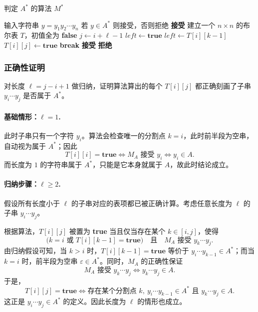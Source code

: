 \begin{answerred}
\begin{myalgo}{判定 $A^*$ 的算法 $M^*$}
\begin{algorithmic}[1]
  \Require 输入字符串 $y = y_1 y_2 \cdots y_n$
  \Ensure 若 $y \in A^*$ 则接受，否则拒绝
    \State \textbf{接受}
  \EndIf
  \State 建立一个 $n \times n$ 的布尔表 $T$，初值全为 \textbf{false}
      \State $j \gets i+\ell-1$
          \State $left \gets \mathbf{true}$
        \Else
          \State $left \gets T[i][k-1]$
        \EndIf
          \State $T[i][j] \gets \mathbf{true}$
          \State \textbf{break}
        \EndIf
      \EndFor
    \EndFor
  \EndFor
    \State \textbf{接受}
  \Else
    \State \textbf{拒绝}
  \EndIf
\end{algorithmic}
\end{myalgo}

\subsubsection*{正确性证明}

对长度 $\ell = j-i+1$ 做归纳，证明算法算出的每个 $T[i][j]$ 都正确刻画了子串 $y_i \cdots y_j$ 是否属于 $A^*$。

\paragraph{基础情形：$\ell=1$.}
此时子串只有一个字符 $y_i$。算法会检查唯一的分割点 $k=i$，此时前半段为空串，自动视为属于 $A^*$；因此
\[
    T[i][i] = \mathbf{true}
    \iff
    M_A \text{ 接受 } y_i
    \iff
    y_i \in A.
\]
而长度为 $1$ 的字符串属于 $A^*$，只能是它本身就属于 $A$，故此时结论成立。

\paragraph{归纳步骤：$\ell \ge 2$.}
假设所有长度小于 $\ell$ 的子串对应的表项都已被正确计算。考虑任意长度为 $\ell$ 的子串 $y_i \cdots y_j$。

根据算法，$T[i][j]$ 被置为 \textbf{true} 当且仅当存在某个 $k \in [i,j]$，使得
\[
    \bigl(k=i \text{ 或 } T[i][k-1]=\mathbf{true}\bigr)
    \quad \text{且} \quad
    M_A \text{ 接受 } y_k \cdots y_j.
\]
由归纳假设可知，当 $k>i$ 时，$T[i][k-1]=\mathbf{true}$ 等价于 $y_i \cdots y_{k-1} \in A^*$；而当 $k=i$ 时，前半段为空串 $\varepsilon \in A^*$。同时，$M_A$ 的正确性保证
\[
    M_A \text{ 接受 } y_k \cdots y_j
    \iff
    y_k \cdots y_j \in A.
\]
于是，
\[
    T[i][j]=\mathbf{true}
    \iff
    \text{存在某个分割点 } k,\ 
    y_i \cdots y_{k-1} \in A^*
    \text{ 且 }
    y_k \cdots y_j \in A.
\]
这正是 $y_i \cdots y_j \in A^*$ 的定义。因此长度为 $\ell$ 的情形也成立。


\end{answerred}

